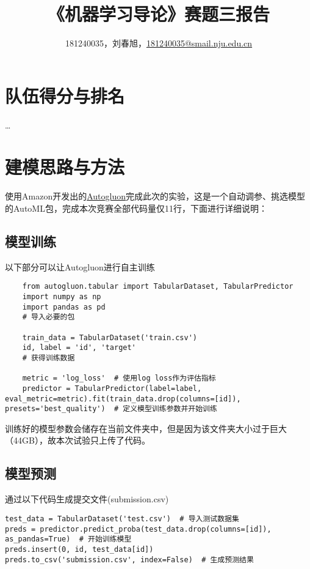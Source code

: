 \documentclass[a4paper,UTF8]{article}
\theoremstyle{definition}
\begin{document}
\title{\textbf{《机器学习导论》赛题三报告}}
\author{181240035，刘春旭，\href{mailto:181240035@smail.nju.edu.cn}{181240035@smail.nju.edu.cn}}
\maketitle

\section{队伍得分与排名}
\dots

\section{建模思路与方法}
使用Amazon开发出的\href{https://auto.gluon.ai/stable/index.html}{Autogluon}完成此次的实验，这是一个自动调参、挑选模型的AutoML包，完成本次竞赛全部代码量仅11行，下面进行详细说明：
\subsection{模型训练}
以下部分可以让Autogluon进行自主训练
\begin{lstlisting}
    from autogluon.tabular import TabularDataset, TabularPredictor
    import numpy as np
    import pandas as pd
    # 导入必要的包
    
    train_data = TabularDataset('train.csv')
    id, label = 'id', 'target'
    # 获得训练数据
    
    metric = 'log_loss'  # 使用log loss作为评估指标
    predictor = TabularPredictor(label=label, eval_metric=metric).fit(train_data.drop(columns=[id]),  presets='best_quality')  # 定义模型训练参数并开始训练
\end{lstlisting}
训练好的模型参数会储存在当前文件夹中，但是因为该文件夹大小过于巨大（44GB），故本次试验只上传了代码。

\subsection{模型预测}
通过以下代码生成提交文件(submission.csv)
\begin{lstlisting}
test_data = TabularDataset('test.csv')  # 导入测试数据集
preds = predictor.predict_proba(test_data.drop(columns=[id]), as_pandas=True)  # 开始训练模型
preds.insert(0, id, test_data[id])
preds.to_csv('submission.csv', index=False)  # 生成预测结果
\end{lstlisting}
\end{document}
